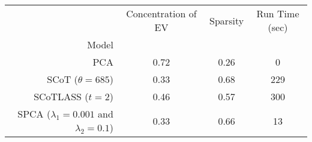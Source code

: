 \begin{tabular}{r|ccc}
\toprule
{} &  Concentration of EV &  Sparsity & Run Time (sec) \\
Model                                        &                      &           &                \\
\midrule
PCA                                          &                 0.72 &      0.26 &              0 \\
SCoT ($\theta = 685$)                        &                 0.33 &      0.68 &            229 \\
SCoTLASS ($t = 2$)                           &                 0.46 &      0.57 &            300 \\
SPCA ($\lambda_1=0.001$ and $\lambda_2=0.1$) &                 0.33 &      0.66 &             13 \\
\bottomrule
\end{tabular}
